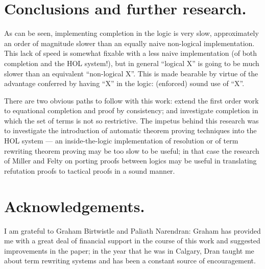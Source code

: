 \section{Conclusions and further research.}

As can be seen, implementing completion in the logic is very slow,
approximately an order of magnitude slower than an equally naive non-logical
implementation. This lack of speed is somewhat fixable with a less naive
implementation (of both completion and the HOL system!), but in general
``logical X'' is going to be much slower than an equivalent ``non-logical X''.
This is made bearable by virtue of the advantage conferred by having ``X'' in
the logic: (enforced) sound use of ``X''.

There are two obvious paths to follow with this work: extend the first order
work to equational completion and proof by consistency; and investigate
completion in which the set of terms is not so restrictive. The impetus behind
this research was to investigate the introduction of automatic theorem proving
techniques into the HOL system --- an inside-the-logic implementation of
resolution or of term rewriting theorem proving \cite{hsder83} may be too slow
to be useful; in that case the research of Miller and Felty
\cite{millersl,felty86} on porting proofs between logics may be useful in
translating refutation proofs to tactical proofs in a sound manner.


\section*{Acknowledgements.}

I am grateful to Graham Birtwistle and Paliath Narendran: Graham has provided
me with a great deal of financial support in the course of this work and suggested
improvements in the paper; in the year that he was in Calgary, Dran taught me
about term rewriting systems and has been a constant source of encouragement.

